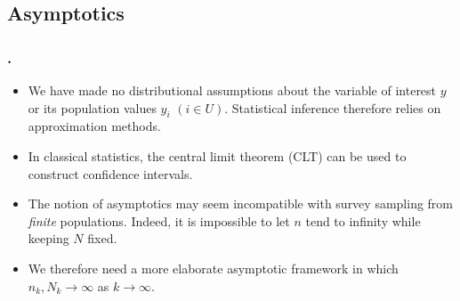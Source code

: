 \documentclass{my_eth_beamer}
\numberwithin{equation}{section}
\begin{document}
\subsection{Asymptotics}\label{sec:basics_asymptotics}

\begin{frame}
    \frametitle{\insertsectionnumber.\insertsubsectionnumber~\insertsubsection}
    \begin{itemize}
    \setlength{\itemsep}{8pt}
        \item We have made \alert{no distributional assumptions} about the
            variable of interest $y$ or its population values $y_i$ $(i \in
            U)$. Statistical inference therefore relies on \alert{approximation
            methods}.
        \item In classical statistics, the \alert{central limit theorem}
            (CLT) can be used to construct confidence intervals.
        \item The notion of asymptotics may seem incompatible with survey
            sampling from \emph{finite} populations. Indeed, it is impossible
            to let $n$ tend to infinity while keeping $N$ fixed.
        \item We therefore need a \alert{more elaborate asymptotic framework}
            in which $n_k,N_k \rightarrow \infty$ as $k \rightarrow \infty$.
    \end{itemize}
\end{frame}
\end{document}
